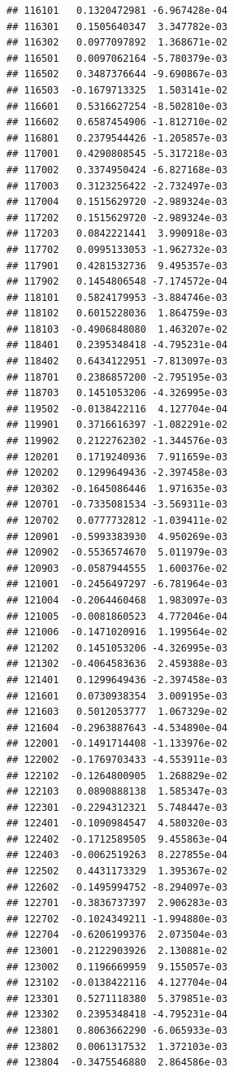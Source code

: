 \begin{frame}[fragile]
\begin{verbatim}
## 116101   0.1320472981 -6.967428e-04
## 116301   0.1505640347  3.347782e-03
## 116302   0.0977097892  1.368671e-02
## 116501   0.0097062164 -5.780379e-03
## 116502   0.3487376644 -9.690867e-03
## 116503  -0.1679713325  1.503141e-02
## 116601   0.5316627254 -8.502810e-03
## 116602   0.6587454906 -1.812710e-02
## 116801   0.2379544426 -1.205857e-03
## 117001   0.4290808545 -5.317218e-03
## 117002   0.3374950424 -6.827168e-03
## 117003   0.3123256422 -2.732497e-03
## 117004   0.1515629720 -2.989324e-03
## 117202   0.1515629720 -2.989324e-03
## 117203   0.0842221441  3.990918e-03
## 117702   0.0995133053 -1.962732e-03
## 117901   0.4281532736  9.495357e-03
## 117902   0.1454806548 -7.174572e-04
## 118101   0.5824179953 -3.884746e-03
## 118102   0.6015228036  1.864759e-03
## 118103  -0.4906848080  1.463207e-02
## 118401   0.2395348418 -4.795231e-04
## 118402   0.6434122951 -7.813097e-03
## 118701   0.2386857200 -2.795195e-03
## 118703   0.1451053206 -4.326995e-03
## 119502  -0.0138422116  4.127704e-04
## 119901   0.3716616397 -1.082291e-02
## 119902   0.2122762302 -1.344576e-03
## 120201   0.1719240936  7.911659e-03
## 120202   0.1299649436 -2.397458e-03
## 120302  -0.1645086446  1.971635e-03
## 120701  -0.7335081534 -3.569311e-03
## 120702   0.0777732812 -1.039411e-02
## 120901  -0.5993383930  4.950269e-03
## 120902  -0.5536574670  5.011979e-03
## 120903  -0.0587944555  1.600376e-02
## 121001  -0.2456497297 -6.781964e-03
## 121004  -0.2064460468  1.983097e-03
## 121005  -0.0081860523  4.772046e-04
## 121006  -0.1471020916  1.199564e-02
## 121202   0.1451053206 -4.326995e-03
## 121302  -0.4064583636  2.459388e-03
## 121401   0.1299649436 -2.397458e-03
## 121601   0.0730938354  3.009195e-03
## 121603   0.5012053777  1.067329e-02
## 121604  -0.2963887643 -4.534890e-04
## 122001  -0.1491714408 -1.133976e-02
## 122002  -0.1769703433 -4.553911e-03
## 122102  -0.1264800905  1.268829e-02
## 122103   0.0890888138  1.585347e-03
## 122301  -0.2294312321  5.748447e-03
## 122401  -0.1090984547  4.580320e-03
## 122402  -0.1712589505  9.455863e-04
## 122403  -0.0062519263  8.227855e-04
## 122502   0.4431173329  1.395367e-02
## 122602  -0.1495994752 -8.294097e-03
## 122701  -0.3836737397  2.906283e-03
## 122702  -0.1024349211 -1.994880e-03
## 122704  -0.6206199376  2.073504e-03
## 123001  -0.2122903926  2.130881e-02
## 123002   0.1196669959  9.155057e-03
## 123102  -0.0138422116  4.127704e-04
## 123301   0.5271118380  5.379851e-03
## 123302   0.2395348418 -4.795231e-04
## 123801   0.8063662290 -6.065933e-03
## 123802   0.0061317532  1.372103e-03
## 123804  -0.3475546880  2.864586e-03

\end{verbatim}
\end{frame}
